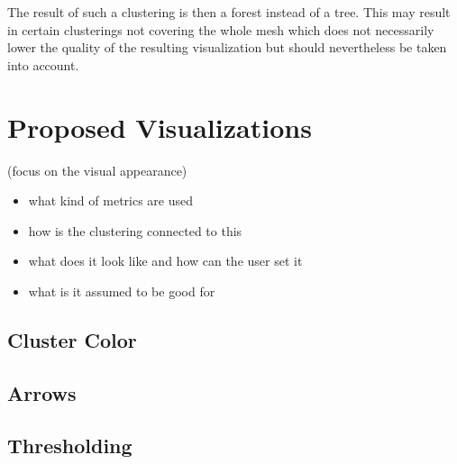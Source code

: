 The result of such a clustering is then a forest instead of a tree. This may result in certain clusterings not covering the whole mesh which does not necessarily lower the quality of the resulting visualization but should nevertheless be taken into account.
\section{Proposed Visualizations}

(focus on the visual appearance)

\begin{itemize}
\item what kind of metrics are used
\item how is the clustering connected to this
\item what does it look like and how can the user set it
\item what is it assumed to be good for 
\end{itemize}

\subsection{Cluster Color}

\subsection{Arrows}

\subsection{Thresholding}

